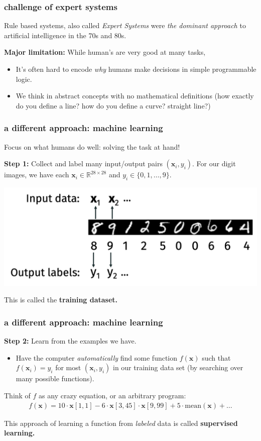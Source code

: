 \documentclass[handout,compress]{beamer}
\newcommand{\bv}[1]{\mathbf{#1}}
\newcommand{\R}{\mathbb{R}}
\begin{document}
\begin{frame}
	\frametitle{challenge of expert systems}
	Rule based systems, also called \emph{Expert Systems} were \emph{the dominant approach} to artificial intelligence in the 70s and 80s.
	
	\vspace{1em}
	\textbf{Major limitation:} While human's are very good at many tasks,
	\begin{itemize}
		\item It's often hard to encode \emph{why} humans make decisions in simple programmable logic.
		\item We think in abstract concepts with no mathematical definitions (how exactly do you define a line? how do you define a curve? straight line?)
	\end{itemize}
\end{frame}

\begin{frame}
	\frametitle{a different approach: machine learning}
	Focus on what humans do well: solving the task at hand!

	\textbf{Step 1:}
	Collect and label many input/output pairs $(\bv{x}_i,y_i)$.
	For our digit images, we have each $\bv{x}_i\in \R^{28\times 28}$ and $y_i \in \{0, 1, \ldots, 9\}$. 
	\begin{center}
		\includegraphics[width=.6\textwidth]{collect_data.png}
	\end{center}
	This is called the \textbf{\alert{training dataset.}}
\end{frame}

\begin{frame}
	\frametitle{a different approach: machine learning}
	\textbf{Step 2:} Learn from the examples we have.
	\begin{itemize}
		\item Have the computer \emph{automatically} find some function $f(\bv{x})$ such that $f(\bv{x}_i) = y_i$ for most $(\bv{x}_i,y_i)$ in our training data set (by searching over many possible functions).
	\end{itemize}
Think of $f$ as any crazy equation, or an arbitrary program:
\begin{align*}
f(\bv{x}) = 10 \cdot\bv{x}[1,1] - 6 \cdot\bv{x}[3,45]\cdot\bv{x}[9,99] + 5 \cdot\text{mean}(\bv{x}) + \ldots
\end{align*}


This approach of learning a function from \emph{labeled} data is called \alert{\textbf{supervised learning.}}
\end{frame}
\end{document}
